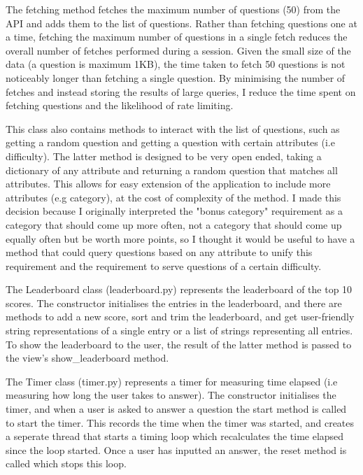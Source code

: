 \documentclass[12pt]{article}
\begin{document}
The fetching method fetches the maximum number of questions (50) from the API and adds them to the list of questions. Rather than fetching questions one at a time, fetching the maximum number of questions in a single fetch reduces the overall number of fetches performed during a session. Given the small size of the data (a question is maximum 1KB), the time taken to fetch 50 questions is not noticeably longer than fetching a single question. By minimising the number of fetches and instead storing the results of large queries, I reduce the time spent on fetching questions and the likelihood of rate limiting.

This class also contains methods to interact with the list of questions, such as getting a random question and getting a question with certain attributes (i.e difficulty). The latter method is designed to be very open ended, taking a dictionary of any attribute and returning a random question that matches all attributes. This allows for easy extension of the application to include more attributes (e.g category), at the cost of complexity of the method. I made this decision because I originally interpreted the "bonus category" requirement as a category that should come up more often, not a category that should come up equally often but be worth more points, so I thought it would be useful to have a method that could query questions based on any attribute to unify this requirement and the requirement to serve questions of a certain difficulty.

\vspace{\baselineskip}

The Leaderboard class (leaderboard.py) represents the leaderboard of the top 10 scores. The constructor initialises the entries in the leaderboard, and there are methods to add a new score, sort and trim the leaderboard, and get user-friendly string representations of a single entry or a list of strings representing all entries. To show the leaderboard to the user, the result of the latter method is passed to the view's show\_leaderboard method.

\vspace{\baselineskip}

The Timer class (timer.py) represents a timer for measuring time elapsed (i.e measuring how long the user takes to answer). The constructor initialises the timer, and when a user is asked to answer a question the start method is called to start the timer. This records the time when the timer was started, and creates a seperate thread that starts a timing loop which recalculates the time elapsed since the loop started. Once a user has inputted an answer, the reset method is called which stops this loop.
\end{document}
